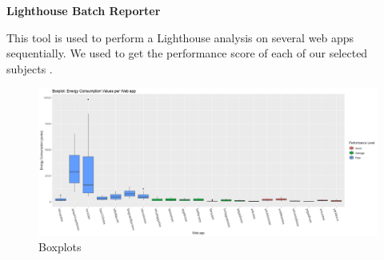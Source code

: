 \textbf{Lighthouse Batch Reporter}

This tool is used to perform a Lighthouse analysis on several web apps sequentially. We used to get the performance score of each of our selected subjects \cite{WEBSITE:12}.

\begin{figure}
  \includegraphics[width=\textwidth]{./NewImages/Fig_3_Boxplot_for_All_Websites.png}
  \caption{Boxplots}
  \label{fig:boxplots-all}
\end{figure}